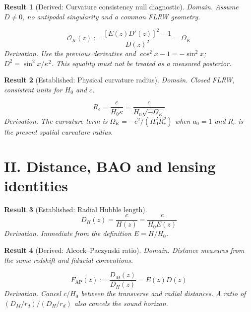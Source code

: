 \documentclass[aps,prd,onecolumn,notitlepage,groupedaddress,11pt]{revtex4-2}
\newtheorem{result}{Result}
\begin{document}
\begin{result}[\textsf{Derived}: Curvature consistency null diagnostic]\label{res:5}
\textit{Domain.} Assume $D\ne0$, no antipodal singularity and a common FLRW geometry.\par
\begin{equation}\label{eq:5}
\mathcal O_K(z):=\frac{[E(z)D\prime(z)]^2-1}{D(z)^2}=\Omega_K
\end{equation}
\textit{Derivation.} Use the previous derivative and $\cos^2x-1=-\sin^2x$; $D^2=\sin^2x/\kappa^2$. This equality must not be treated as a measured posterior.
\end{result}

\begin{result}[\textsf{Established}: Physical curvature radius]\label{res:6}
\textit{Domain.} Closed FLRW, consistent units for $H_0$ and $c$.\par
\begin{equation}\label{eq:6}
R_c=\frac{c}{H_0\kappa}=\frac{c}{H_0\sqrt{-\Omega_K}}
\end{equation}
\textit{Derivation.} The curvature term is $\Omega_K=-c^2/(H_0^2R_c^2)$ when $a_0=1$ and $R_c$ is the present spatial curvature radius.
\end{result}

\section{II. Distance, BAO and lensing identities}

\begin{result}[\textsf{Established}: Radial Hubble length]\label{res:7}
\begin{equation}\label{eq:7}
D_H(z)=\frac{c}{H(z)}=\frac{c}{H_0E(z)}
\end{equation}
\textit{Derivation.} Immediate from the definition $E=H/H_0$.
\end{result}

\begin{result}[\textsf{Derived}: Alcock--Paczynski ratio]\label{res:8}
\textit{Domain.} Distance measures from the same redshift and fiducial conventions.\par
\begin{equation}\label{eq:8}
F_{\mathrm{AP}}(z):=\frac{D_M(z)}{D_H(z)}=E(z)D(z)
\end{equation}
\textit{Derivation.} Cancel $c/H_0$ between the transverse and radial distances. A ratio of $(D_M/r_d)/(D_H/r_d)$ also cancels the sound horizon.
\end{result}
\end{document}
